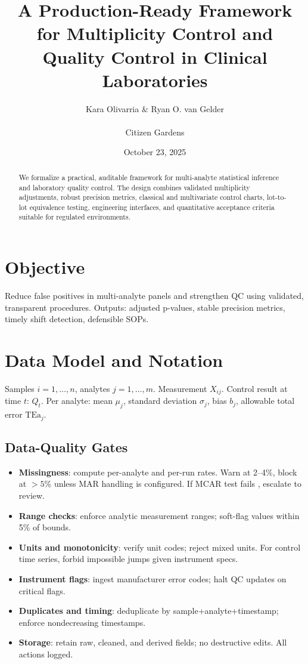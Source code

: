 \documentclass[11pt]{article}
\title{A Production-Ready Framework for Multiplicity Control and Quality Control in Clinical Laboratories}
\author{Kara Olivarria \& Ryan O. van Gelder  \\  \\ Citizen Gardens}
\date{October 23, 2025}
\begin{document}
\maketitle

\begin{abstract}
We formalize a practical, auditable framework for multi-analyte statistical inference and laboratory quality control. The design combines validated multiplicity adjustments, robust precision metrics, classical and multivariate control charts, lot-to-lot equivalence testing, engineering interfaces, and quantitative acceptance criteria suitable for regulated environments.
\end{abstract}

\section{Objective}
Reduce false positives in multi-analyte panels and strengthen QC using validated, transparent procedures. Outputs: adjusted p-values, stable precision metrics, timely shift detection, defensible SOPs.

\section{Data Model and Notation}
Samples \(i=1,\dots,n\), analytes \(j=1,\dots,m\). Measurement \(X_{ij}\). Control result at time \(t\): \(Q_t\). Per analyte: mean \(\mu_j\), standard deviation \(\sigma_j\), bias \(b_j\), allowable total error \(\mathrm{TEa}_j\).

\subsection{Data-Quality Gates}
\begin{itemize}
  \item \textbf{Missingness}: compute per-analyte and per-run rates. Warn at 2--4\%, block at $>5$\% unless MAR handling is configured. If MCAR test fails \cite{Little1988}, escalate to review.
  \item \textbf{Range checks}: enforce analytic measurement ranges; soft-flag values within 5\% of bounds.
  \item \textbf{Units and monotonicity}: verify unit codes; reject mixed units. For control time series, forbid impossible jumps given instrument specs.
  \item \textbf{Instrument flags}: ingest manufacturer error codes; halt QC updates on critical flags.
  \item \textbf{Duplicates and timing}: deduplicate by sample+analyte+timestamp; enforce nondecreasing timestamps.
  \item \textbf{Storage}: retain raw, cleaned, and derived fields; no destructive edits. All actions logged.
\end{itemize}
\end{document}
